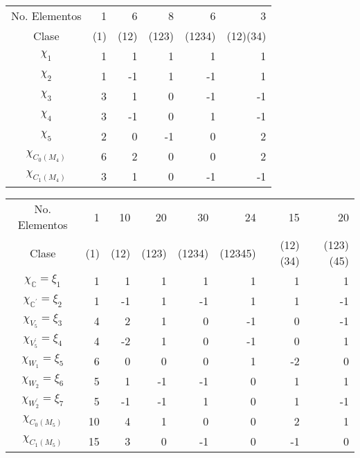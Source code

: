 \documentclass[12pt]{book}
\theoremstyle{definition}
\newcounter{in}
\begin{document}
{\begin{center}
\begin{tabular}{c|r r r r r}
  No. Elementos& 1 & 6 & 8 & 6 & 3 \\
  Clase & (1) & (12) & (123) & (1234) &(12)(34)\\
    \hline
  $\chi_{{1}}$ & 1 & 1 & 1 & 1 & 1 \\
  $\chi_{{2}}$ & 1 & -1 & 1 & -1 & 1\\
  $\chi_{{3}}$ & 3 & 1 & 0 & -1 & -1\\
  $\chi_{{4}}$ & 3 & -1 & 0 & 1 & -1 \\
  $\chi_{{5}}$ & 2 & 0 & -1 & 0 & 2 \\
    \hline
  $\chi_{C_{0}(M_{4})}$ & 6 & 2 & 0 & 0 & 2 \\
  $\chi_{C_{1}(M_{4})}$ & 3 & 1 & 0 & -1 & -1
\end{tabular}
\end{center}

\bigskip

\begin{center}
\begin{small}
\begin{tabular}{c |r r r r r r r}
  No. Elementos& 1 & 10 & 20 & 30 & 24 & 15 & 20  \\
  Clase & (1) & (12) & (123) & (1234) & (12345) & (12)(34) & (123)(45) \\
    \hline
  $\chi_{\mathbb{C}}=\xi_{1}$ & 1 & 1 & 1 & 1 & 1 & 1 & 1 \\
  $\chi_{\mathbb{C}^{'}}=\xi_{2}$ & 1 & -1 & 1 & -1 & 1 & 1 & -1\\
  $\chi_{V_{5}}=\xi_{3}$ & 4 & 2 & 1 & 0 & -1 & 0 & -1\\
  $\chi_{V_{5}^{'}}=\xi_{4}$ & 4 & -2 & 1 & 0 & -1 & 0 & 1 \\
  $\chi_{W_{1}}=\xi_{5}$ & 6 & 0 & 0 & 0 & 1 & -2 & 0 \\
  $\chi_{W_{2}}=\xi_{6}$ & 5 & 1 & -1 & -1 & 0 & 1 & 1 \\
  $\chi_{W_{2}^{'}}=\xi_{7}$ & 5 & -1 & -1 & 1 & 0 & 1 & -1 \\
  \hline
  $\chi_{C_{0}(M_{5})}$ & 10 & 4 & 1 & 0 & 0 & 2 & 1 \\
  $\chi_{C_{1}(M_{5})}$ & 15 & 3 & 0 & -1 & 0 & -1 & 0
\end{tabular}
\end{small}
\end{center}

\bigskip

}
\end{document}
